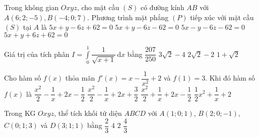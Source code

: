 \begin{ex}%
Trong không gian $O x y z$, cho mặt cầu $(S)$ có đường kính $A B$ với $A(6 ; 2 ;-5), B(-4 ; 0 ; 7)$. Phương trình mặt phẳng $(P)$ tiếp xúc với mặt cầu $(S)$ tại $A$ là
\choice
{$5 x+y-6 z+62=0$}
{\True $5 x+y-6 z-62=0$}
{$5 x-y-6 z-62=0$}
{$5 x+y+6 z+62=0$}
\end{ex}

\begin{ex}%
Giá trị của tích phân $I=\displaystyle\int\limits_{0}^{1}\dfrac{1}{\sqrt{x+1}}\mathrm{\, d}x$ bằng
\choice
{$\dfrac{207}{250}$}
{$3\sqrt{2}-4$}
{\True $2\sqrt{2}-2$}
{$1+\sqrt{2}$}
\end{ex}

\begin{ex}%
Cho hàm số $ f(x) $ thỏa mãn $ f'(x)=x-\dfrac{1}{x^2}+2 $ và $ f(1)=3 $. Khi đó hàm số $ f(x) $ là
\choice
{$ \dfrac{x^2}{2}-\dfrac{1}{x}+2x-\dfrac{1}{2} $}
{$ \dfrac{x^2}{2}-\dfrac{1}{x}+2x+\dfrac{3}{2} $}
{\True $ \dfrac{x^2}{2}+\dfrac{1}{x}+2x-\dfrac{1}{2} $}
{$ \dfrac{1}{2}x^2+\dfrac{1}{x}+2 $}
\end{ex}

\begin{ex}%
Trong KG $Oxyz$, thể tích khối tứ diện $ABCD$ với $A(1;0;1)$, $B(2;0;-1), $ $C(0;1;3)$ và $D(3; 1; 1)$ bằng \choice
{\True $\dfrac{2}{3} $}
{$4 $}
{$ 2 $}
{$\dfrac{4}{3}$}
\end{ex}

